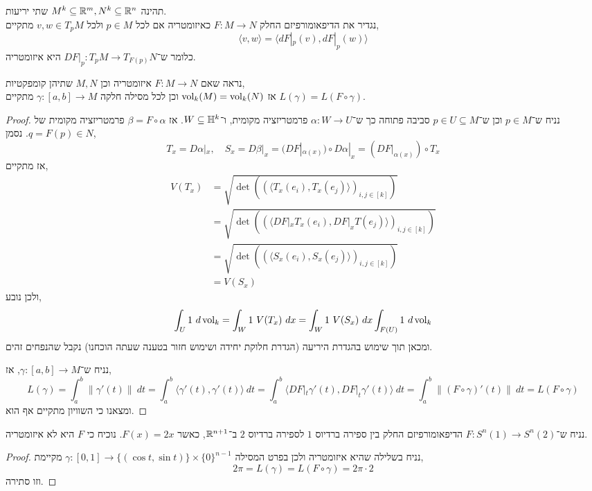 \question{}
תהינה $M^k \subseteq \mathbb{R}^m, N^k \subseteq \mathbb{R}^n$ שתי יריעות. \\
נגדיר את הדיפאומורפיזם החלק $F : M \to N$ כאיזומטריה אם לכל $p \in M$ ולכל $v, w \in T_p M$ מתקיים,
\[
	\langle v, w \rangle
	= \langle d F |_p (v), d F |_p (w) \rangle
\]
כלומר ש־$DF |_p : T_p M \to T_{F(p)} N$ היא איזומטריה.

\subquestion{}
נראה שאם $F : M \to N$ איזומטריה וכן $M, N$ שתיהן קומפקטיות, \\
אז $\operatorname{vol}_k(M) = \operatorname{vol}_k(N)$ וכן לכל מסילה חלקה $\gamma : [a, b] \to M$ מתקיים $L(\gamma) = L(F \circ \gamma)$.
\begin{proof}
	נניח ש־$p \in M$ וכן ש־$p \in U \subseteq M$ סביבה פתוחה כך ש־$\alpha : W \to U$ פרמטריזציה מקומית, ו־$W \subseteq \mathbb{H}^k$.
	אז $\beta = F \circ \alpha$ פרמטריזציה מקומית של $q = F(p) \in N$.
	נסמן,
	\[
		T_x = D \alpha |_x,
		\quad
		S_x
		= D \beta |_x
		= (D F |_{\alpha(x)}) \circ D \alpha |_x
		= (D F |_{\alpha(x)}) \circ T_x
	\]
	אז מתקיים,
	\begin{align*}
		V(T_x)
		& = \sqrt{\det\left({(\langle T_x(e_i), T_x(e_j) \rangle)}_{i, j \in [k]}\right)} \\
		& = \sqrt{\det\left({(\langle D F |_x T_x(e_i), D F |_x T(e_j) \rangle)}_{i, j \in [k]}\right)} \\
		& = \sqrt{\det\left({(\langle S_x(e_i), S_x(e_j) \rangle)}_{i, j \in [k]}\right)} \\
		& = V(S_x)
	\end{align*}
	ולכן נובע,
	\[
		\int_U 1\ d\operatorname{vol}_k
		= \int_{W} 1\ V(T_x)\ dx
		= \int_{W} 1\ V(S_x)\ dx
		\int_{F(U)} 1\ d\operatorname{vol}_k
	\]
	ומכאן תוך שימוש בהגדרת היריעה (הגדרת חלוקת יחידה ושימוש חזור בטענה שעתה הוכחנו) נקבל שהנפחים זהים.

	נניח ש־$\gamma : [a, b] \to M$, אז,
	\[
		L(\gamma)
		= \int_{a}^{b} \lVert \gamma'(t) \rVert\ dt
		= \int_{a}^{b} \langle \gamma'(t), \gamma'(t) \rangle\ dt
		= \int_{a}^{b} \langle D F |_t \gamma'(t), D F |_t \gamma'(t) \rangle\ dt
		= \int_{a}^{b} \lVert (F \circ \gamma)'(t) \rVert\ dt
		= L(F \circ \gamma)
	\]
	ומצאנו כי השוויון מתקיים אף הוא.
\end{proof}

\subquestion{}
נניח ש־$F : S^n(1) \to S^n(2)$ הדיפאומורפיזם החלק בין ספירה ברדיוס $1$ לספירה ברדיוס $2$ ב־$\mathbb{R}^{n + 1}$, כאשר $F(x) = 2x$.
נוכיח כי $F$ היא לא איזומטריה.
\begin{proof}
	נניח בשלילה שהיא איזומטריה ולכן בפרט המסילה $\gamma : [0, 1] \to \{ (\cos t, \sin t) \} \times {\{ 0 \}}^{n - 1}$ מקיימת,
	\[
		2 \pi
		= L(\gamma)
		= L(F \circ \gamma)
		= 2 \pi \cdot 2
	\]
	וזו סתירה.
\end{proof}

